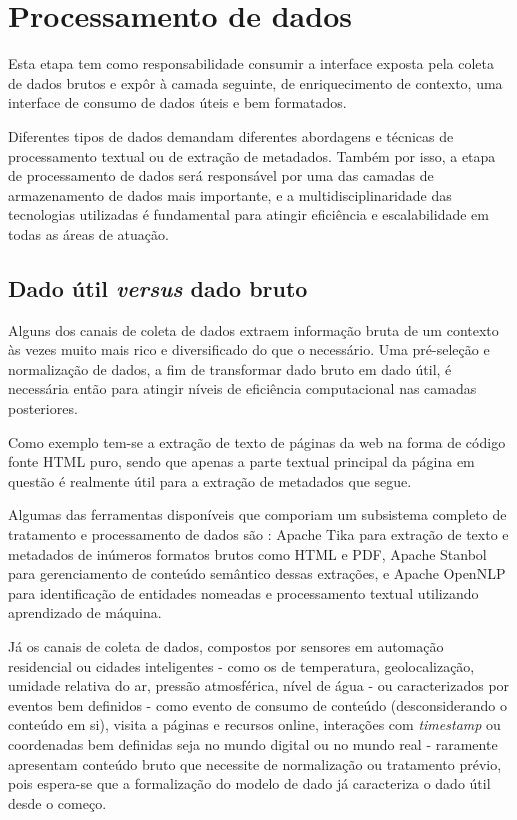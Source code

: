 \chapter{Processamento de dados} \label{c:processamento_de_dados}

Esta etapa tem como responsabilidade consumir a interface exposta pela coleta de dados brutos e expôr à camada seguinte, de enriquecimento de contexto, uma interface de consumo de dados úteis e bem formatados.

Diferentes tipos de dados demandam diferentes abordagens e técnicas de processamento textual ou de extração de metadados. Também por isso, a etapa de processamento de dados será responsável por uma das camadas de armazenamento de dados mais importante, e a multidisciplinaridade das tecnologias utilizadas é fundamental para atingir eficiência e escalabilidade em todas as áreas de atuação.

\section{Dado útil \textit{versus} dado bruto} \label{s:dado_util_vs_dado_bruto}

Alguns dos canais de coleta de dados extraem informação bruta de um contexto às vezes muito mais rico e diversificado do que o necessário. Uma pré-seleção e normalização de dados, a fim de transformar dado bruto em dado útil, é necessária então para atingir níveis de eficiência computacional nas camadas posteriores.

Como exemplo tem-se a extração de texto de páginas da web na forma de código fonte HTML puro, sendo que apenas a parte textual principal da página em questão é realmente útil para a extração de metadados que segue.

Algumas das ferramentas disponíveis que comporiam um subsistema completo de tratamento e processamento de dados são \cite{ital:jung-andrew}: Apache Tika \cite{apache:tika} para extração de texto e metadados de inúmeros formatos brutos como HTML e PDF, Apache Stanbol \cite{apache:stanbol} para gerenciamento de conteúdo semântico dessas extrações, e Apache OpenNLP \cite{apache:opennlp} para identificação de entidades nomeadas e processamento textual utilizando aprendizado de máquina.

Já os canais de coleta de dados, compostos por sensores em automação residencial ou cidades inteligentes - como os de temperatura, geolocalização, umidade relativa do ar, pressão atmosférica, nível de água - ou caracterizados por eventos bem definidos - como evento de consumo de conteúdo (desconsiderando o conteúdo em si), visita a páginas e recursos online, interações com \textit{timestamp} ou coordenadas bem definidas seja no mundo digital ou no mundo real - raramente apresentam conteúdo bruto que necessite de normalização ou tratamento prévio, pois espera-se que a formalização do modelo de dado já caracteriza o dado útil desde o começo.

